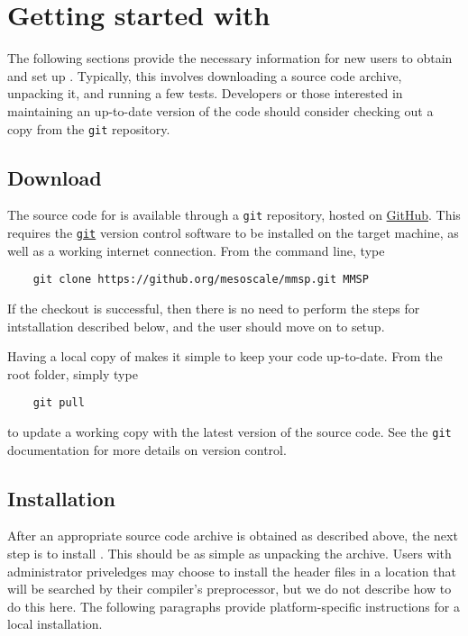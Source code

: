 
\chapter{Getting started with \MMSP}
The following sections provide the necessary information for new users to obtain and set up \MMSP.  Typically, this involves downloading a source code archive, unpacking it, and running a few tests.  Developers or those interested in maintaining an up-to-date version of the code should consider checking out a copy from the {\tt git} repository.

\section{Download}
The source code for \MMSP is available through a {\tt git} repository, hosted on \href{https://github.com/mesoscale/mmsp}{GitHub}.  This requires the \href{http://www.git-scm.com}{\tt git} version control software to be installed on the target machine, as well as a working internet connection.  From the command line, type
\begin{shadebox}
\begin{verbatim}
    git clone https://github.org/mesoscale/mmsp.git MMSP
\end{verbatim}
\end{shadebox}
If the checkout is successful, then there is no need to perform the steps for intstallation described below, and the user should move on to setup.

Having a local copy of \MMSP makes it simple to keep your code up-to-date.  From the root folder, simply type
\begin{shadebox}
\begin{verbatim}
    git pull
\end{verbatim}
\end{shadebox}
to update a working copy with the latest version of the \MMSP source code.  See the {\tt git} documentation for more details on version control.

\section{Installation}
After an appropriate source code archive is obtained as described above, the next step is to install \MMSP.  This should be as simple as unpacking the archive.  Users with administrator priveledges may choose to install the \MMSP header files in a location that will be searched by their compiler's preprocessor, but we do not describe how to do this here.  The following paragraphs provide platform-specific instructions for a local installation.

